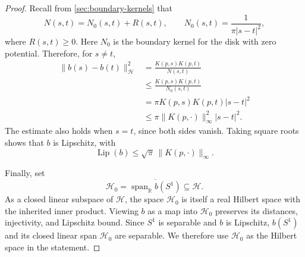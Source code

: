 \begin{proof}
Recall from \cref{sec:boundary-kernels} that
\[
 N(s,t)=N_0(s,t)+R(s,t),\qquad
 N_0(s,t)=\frac1{\pi|s-t|^2},
\]
where $R(s,t)\ge0$. Here $N_0$ is the boundary kernel for the disk
with zero potential. Therefore, for $s\ne t$,
\begin{align*}
 \|b(s)-b(t)\|_{\mathcal H}^2
 &=\frac{K(p,s)K(p,t)}{N(s,t)}\\
 &\le\frac{K(p,s)K(p,t)}{N_0(s,t)}\\
 &=\pi K(p,s)K(p,t)|s-t|^2\\
 &\le\pi\|K(p,\cdot)\|_\infty^2|s-t|^2.
\end{align*}
The estimate also holds when $s=t$, since both sides vanish.
Taking square roots shows that $b$ is Lipschitz, with
\[
 \operatorname{Lip}(b)\le\sqrt\pi\,\|K(p,\cdot)\|_\infty.
\]

Finally, set
\[
 \mathcal H_0=\overline{\operatorname{span}_{\mathbb R}b(S^1)}
 \subseteq\mathcal H.
\]
As a closed linear subspace of $\mathcal H$, the space $\mathcal H_0$
is itself a real Hilbert space with the inherited inner product.
Viewing $b$ as a map into $\mathcal H_0$ preserves its distances,
injectivity, and Lipschitz bound. Since $S^1$ is separable and $b$ is
Lipschitz, $b(S^1)$ and its closed linear span $\mathcal H_0$ are
separable. We therefore use $\mathcal H_0$ as the Hilbert space
in the statement.
\end{proof}

